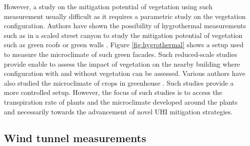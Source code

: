 However, a study on the mitigation potential of vegetation using such measurement usually difficult as it requires a parametric study on the vegetation configuration. Authors have shown the possibility of hygrothermal measurements such as in a scaled street canyon to study the mitigation potential of vegetation such as green roofs or green walls \citep{Djedjig2015,Malys2014}. Figure \ref{fig:hygrothermal} shows a setup used to measure the microclimate of such green facades. Such reduced-scale studies provide enable to assess the impact of vegetation on the nearby building where configuration with and without vegetation can be assessed. Various authors have also studied the microclimate of crops in greenhouse \citep{Kichah2012,Baille1994,Roy, Montero2001,Fatnassi2006,Boulard2002}. Such studies provide a more controlled setup. However, the focus of such studies is to access the transpiration rate of plants and the microclimate developed around the plants and necessarily towards the advancement of novel UHI mitigation strategies. 

\subsection{Wind tunnel measurements}

